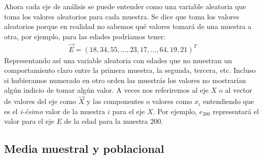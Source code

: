 \documentclass{article}
\begin{document}
Ahora cada eje de análisis se puede entender como una variable aleatoria que toma los valores aleatorios para cada muestra. Se dice que toma los valores aleatorios porque en realidad no sabemos qué valores tomará de una muestra a otra, por ejemplo, para las edades podríamos tener:
\begin{equation}
    \begin{aligned}
        \vec{E} = (18, 34, 55, ..., 23, 17, ..., 64, 19, 21)^T
    \end{aligned}
\end{equation}
Representando así una variable aleatoria con edades que no muestran un comportamiento claro entre la primera muestra, la segunda, tercera, etc. Incluso si hubieramos numerado en otro orden las muestrás los valores no mostrarían algún indicio de tomar algún valor. A veces nos referiremos al eje $X$ o al vector de valores del eje como $\vec{X}$ y las componentes o valores como $x_i$ entendiendo que es el \textit{i-ésimo} valor de la muestra $i$ para el eje $X$. Por ejemplo, $e_{200}$ representará el valor para el eje $E$ de la edad para la muestra $200$.

\subsection{Media muestral y poblacional}
\end{document}
